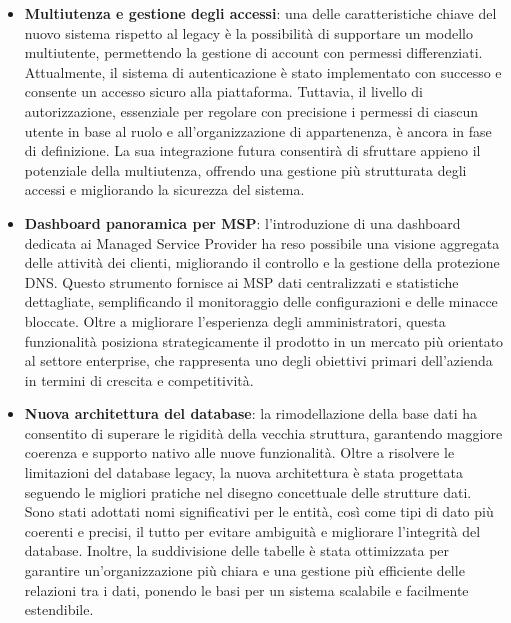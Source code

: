 \begin{itemize}
  \item \textbf{Multiutenza e gestione degli accessi}: una delle caratteristiche chiave del nuovo sistema rispetto al legacy è la possibilità di supportare un modello multiutente, permettendo la gestione di account con permessi differenziati. Attualmente, il sistema di autenticazione è stato implementato con successo e consente un accesso sicuro alla piattaforma. Tuttavia, il livello di autorizzazione, essenziale per regolare con precisione i permessi di ciascun utente in base al ruolo e all’organizzazione di appartenenza, è ancora in fase di definizione. La sua integrazione futura consentirà di sfruttare appieno il potenziale della multiutenza, offrendo una gestione più strutturata degli accessi e migliorando la sicurezza del sistema.

  \item \textbf{Dashboard panoramica per MSP}: l’introduzione di una dashboard dedicata ai Managed Service Provider ha reso possibile una visione aggregata delle attività dei clienti, migliorando il controllo e la gestione della protezione DNS. Questo strumento fornisce ai MSP dati centralizzati e statistiche dettagliate, semplificando il monitoraggio delle configurazioni e delle minacce bloccate. Oltre a migliorare l’esperienza degli amministratori, questa funzionalità posiziona strategicamente il prodotto in un mercato più orientato al settore enterprise, che rappresenta uno degli obiettivi primari dell’azienda in termini di crescita e competitività.

  \item \textbf{Nuova architettura del database}: la rimodellazione della base dati ha consentito di superare le rigidità della vecchia struttura, garantendo maggiore coerenza e supporto nativo alle nuove funzionalità. Oltre a risolvere le limitazioni del database legacy, la nuova architettura è stata progettata seguendo le migliori pratiche nel disegno concettuale delle strutture dati. Sono stati adottati nomi significativi per le entità, così come tipi di dato più coerenti e precisi, il tutto per evitare ambiguità e migliorare l'integrità del database. Inoltre, la suddivisione delle tabelle è stata ottimizzata per garantire un'organizzazione più chiara e una gestione più efficiente delle relazioni tra i dati, ponendo le basi per un sistema scalabile e facilmente estendibile.


\end{itemize}
